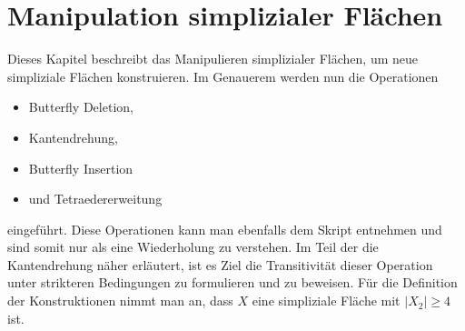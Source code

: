 \documentclass[12pt,titlepage,twoside,cleardoublepage]{article}
\theoremstyle{nummermitklammern}
\newtheorem{definition}[temp]{Definition}
\newtheorem{definition}[zahl]{Definition}
\numberwithin{equation}{section}
\begin{document}
\section{Manipulation simplizialer Flächen}\label{manipulation}
Dieses Kapitel beschreibt das Manipulieren simplizialer Flächen, um neue simpliziale Flächen konstruieren. Im Genauerem werden nun die Operationen
\begin{itemize}
\item Butterfly Deletion,
\item Kantendrehung,
 \item Butterfly Insertion
 \item und Tetraedererweitung
\end{itemize} 
 eingeführt.
Diese Operationen kann man ebenfalls dem Skript entnehmen und sind somit nur als eine Wiederholung zu verstehen. Im Teil der die Kantendrehung näher erläutert, ist es Ziel die Transitivität dieser Operation unter strikteren Bedingungen zu formulieren und zu beweisen.
Für die Definition der Konstruktionen nimmt man an, dass $X$ eine simpliziale Fläche mit $\vert X_2 \vert \geq 4$ ist.

\end{document}
